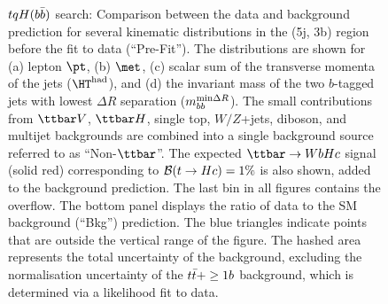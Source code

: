 \begin{figure}[htbp]
\begin{center}
\caption{\small{$tqH(b\bar{b})$ search: Comparison between the data and background prediction for several kinematic 
distributions in the (5j, 3b) region before the fit to data (``Pre-Fit''). 
The distributions are shown for (a) lepton $\pt$, (b) $\met$, (c) scalar sum of the transverse momenta of 
the jets ($\hthad$), and (d) the invariant mass of the two $b$-tagged jets with lowest 
$\Delta R$ separation ($m_{bb}^{\textrm{min}\Delta R}$).
The small contributions from $\ttbar V$, $\ttbar H$, single top, $W/Z$+jets, diboson, and multijet backgrounds are combined 
into a single background source referred to as ``Non-$\ttbar$''. 
The expected $\Hc$ signal (solid red) corresponding to $\mathcal{B}(t\to Hc)=1\%$ is also shown,
added to the background prediction.
The last bin in all figures contains the overflow.
The bottom panel displays the ratio of data to the SM background (``Bkg'') prediction. 
The blue triangles indicate points that are outside the vertical range of the figure. 
The hashed area represents the total uncertainty of the background, excluding the normalisation uncertainty of the $t\bar{t}+\geq1b$ background, 
which is determined via a likelihood fit to data.}}
\label{fig:Hbb_extravars_5j3b}
\end{center}
\end{figure}

